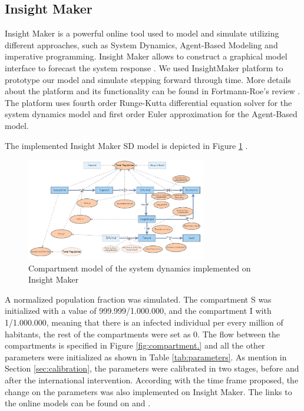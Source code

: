 \subsection{Insight Maker}
 Insight Maker is a powerful online tool used to model and simulate utilizing different approaches, such as System Dynamics, Agent-Based Modeling and imperative programming. Insight Maker allows to construct a graphical model interface to forecast the system response \cite{FortmannRoe}. We used InsightMaker platform to prototype our model and simulate stepping forward through time. More details about the platform and its functionality can be found in Fortmann-Roe's review \cite{FortmannRoe}. The platform uses fourth order Runge-Kutta differential equation solver for the system dynamics model and  first order Euler approximation for the Agent-Based model.

\noindent The implemented Insight Maker SD model is depicted in Figure \ref{fig:SD_IM} .


\begin{figure}[!h]
  \centering
  \includegraphics[width=0.7\textwidth]{SD_IM}
  \caption{ Compartment model of the system dynamics implemented on Insight Maker}
\label{fig:SD_IM} 
\end{figure}

\noindent A normalized population fraction was simulated. The compartment S was initialized with a value of 999.999/1.000.000, and the compartment I with 1/1.000.000, meaning that there is an infected individual per every million of habitants, the rest of the compartments were set as 0. The flow between the compartments is specified in Figure \ref{fig:compartment.} and all the other parameters were initialized as shown in Table \ref{tab:parameters}.  As mention in Section \ref{sec:calibration}, the parameters were calibrated in two stages, before and after the international intervention. According with the time frame proposed, the change on the parameters was also implemented on Insight Maker. The links to the online models can be found on \cite{IM_AI} and  \cite{IM_BI}.  



